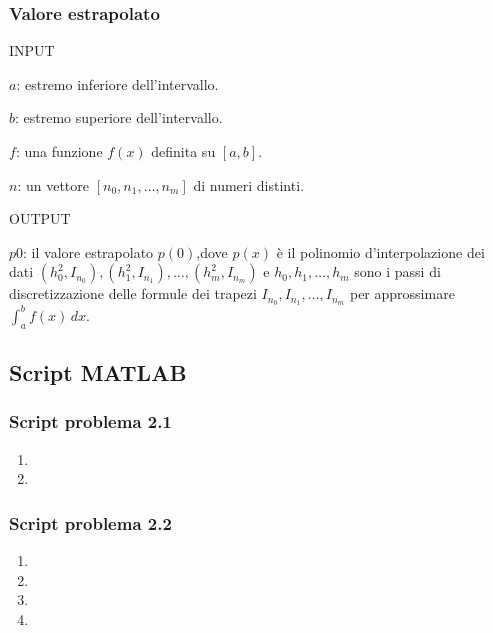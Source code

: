 \documentclass[a4paper,12pt]{article}
\begin{document}
\subsubsection{Valore estrapolato}
INPUT
\begin{description}
\item $a$: estremo inferiore dell'intervallo.
\item $b$: estremo superiore dell'intervallo.
\item $f$: una funzione $f(x)$ definita su $[a, b]$.
\item $n$: un vettore $[n_0, n_1, \dots, n_m]$ di numeri distinti.
\end{description}
OUTPUT
\begin{description}
\item $p0$: il valore estrapolato $p(0)$,dove $p(x)$ è il polinomio d’interpolazione dei dati $(h_0^2, I_{n_{0}}), (h_1^2, I_{n_{1}}), \dots, (h_m^2, I_{n_{m}}) $ e $h_0, h_1,\dots, h_m$ sono i passi di discretizzazione delle formule dei trapezi $ I_{n_{0}}, I_{n_{1}}, \dots, I_{n_{m}}$ per approssimare
$\int_{a}^{b} f(x) \,dx$.
\end{description}





\subsection{Script MATLAB} 
\subsubsection{Script problema 2.1}
\begin{enumerate}[label=(\alph*)]
\item\phantom{-}
\item\phantom{-}
\end{enumerate}

\subsubsection{Script problema 2.2}
\begin{enumerate}[label=(\alph*)]
\item\phantom{-}
\item\phantom{-}
\item\phantom{-}
\item\phantom{-}
\end{enumerate}
\end{document}
